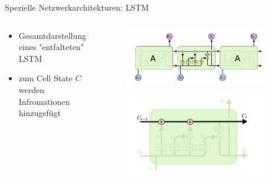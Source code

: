 \documentclass[aspectratio=1610, xcolor=dvipsnames, 9pt]{beamer}
\begin{document}
      \begin{frame}{Spezielle Netzwerkarchitekturen: LSTM}
        \begin{columns}
          \begin{column}{0.6\textwidth}
            \begin{itemize}
              \item Gesamtdarstellung eines "entfalteten" LSTM \newline 
              \item zum Cell State $C$ werden Infromationen hinzugefügt \newline 
              
              
            \end{itemize}
          \end{column}
           \begin{column}{0.4\textwidth}
             \begin{figure}
               \centering
                           \includegraphics[width=0.9\textwidth]{images/LSTM_1.png}
               \end{figure}
               \begin{figure}
                \centering
                            \includegraphics[width=0.9\textwidth]{images/LSTM_2.png}
                \end{figure}

           \end{column}
        \end{columns}
      \end{frame}
      
\end{document}
